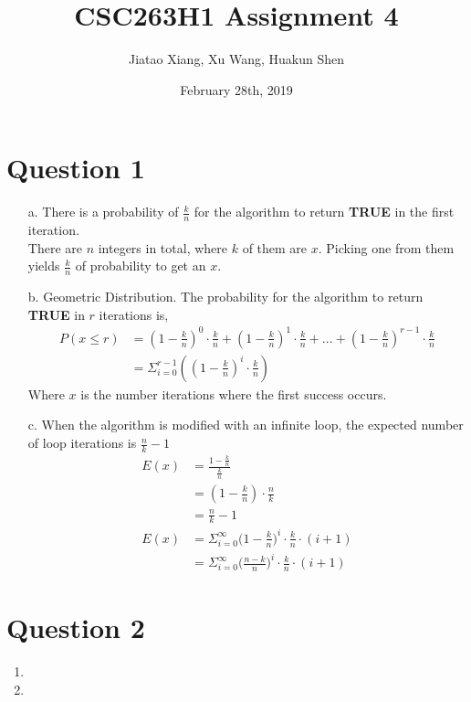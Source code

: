 \documentclass[10pt]{article}
\title{CSC263H1 Assignment 4}
\author{Jiatao Xiang, Xu Wang, Huakun Shen}
\date{February 28th, 2019}
\begin{document}
\maketitle
\section*{Question 1}
\begin{enumerate}
\item[a.] There is a probability of $\frac{k}{n}$ for the algorithm to return \textbf{TRUE} in the first iteration.\\
There are $n$ integers in total, where $k$ of them are $x$. Picking one from them yields $\frac{k}{n}$ of probability to get an $x$.

\item[b.] Geometric Distribution. The probability for the algorithm to return \textbf{TRUE} in $r$ iterations is,
\begin{align*}
P(x\leq r)&=(1-\frac{k}{n})^0\cdot \frac{k}{n}+(1-\frac{k}{n})^1\cdot \frac{k}{n}+...+(1-\frac{k}{n})^{r-1}\cdot \frac{k}{n}\\
&=\Sigma^{r-1}_{i=0}((1-\frac{k}{n})^i\cdot \frac{k}{n})
\end{align*}
Where $x$ is the number iterations where the first success occurs.
\item[c.] When the algorithm is modified with an infinite loop, the expected number of loop iterations is $\frac{n}{k}-1$
\begin{align*}
E(x)&=\frac{1-\frac{k}{n}}{\frac{k}{n}}\\
&=(1-\frac{k}{n})\cdot\frac{n}{k}\\
&=\frac{n}{k}-1\\
E(x)&=\Sigma^\infty_{i=0}\Big(1-\frac{k}{n}\Big)^i\cdot\frac{k}{n}\cdot(i+1)\\
&=\Sigma^\infty_{i=0}\Big(\frac{n-k}{n}\Big)^i\cdot\frac{k}{n}\cdot(i+1)
\end{align*}
\end{enumerate}

\section*{Question 2}
\begin{enumerate}
\item
\item
\end{enumerate}
\end{document}

